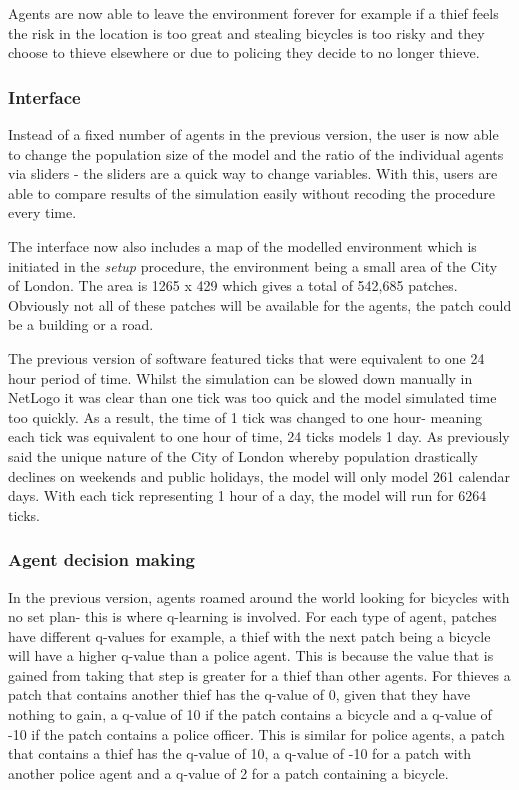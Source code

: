 \documentclass[11pt]{informatics-report}
\begin{document}
Agents are now able to leave the environment forever for example if a thief feels the risk in the location is too great and stealing bicycles is too risky and they choose to thieve elsewhere or due to policing they decide to no longer thieve. 

\subsubsection{Interface}
Instead of a fixed number of agents in the previous version, the user is now able to change the population size of the model and the ratio of the individual agents via sliders - the sliders are a quick way to change variables. With this, users are able to compare results of the simulation easily without recoding the procedure every time. 

The interface now also includes a map of the modelled environment which is initiated in the \textit{setup} procedure, the environment being a small area of the City of London. The area is 1265 x 429 which gives a total of 542,685 patches. Obviously not all of these patches will be available for the agents, the patch could be a building or a road. \par

The previous version of software featured ticks that were equivalent to one 24 hour period of time. Whilst the simulation can be slowed down manually in NetLogo it was clear than one tick was too quick and the model simulated time too quickly. As a result, the time of 1 tick was changed to one hour- meaning each tick was equivalent to one hour of time, 24 ticks models 1 day. As previously said the unique nature of the City of London whereby population drastically declines on weekends and public holidays, the model will only model 261 calendar days. With each tick representing 1 hour of a day, the model will run for 6264 ticks.

\subsubsection{Agent decision making}
In the previous version, agents roamed around the world looking for bicycles with no set plan- this is where q-learning is involved. For each type of agent, patches have different q-values for example, a thief with the next patch being a bicycle will have a higher q-value than a police agent. This is because the value that is gained from taking that step is greater for a thief than other agents. For thieves a patch that contains another thief has the q-value of 0, given that they have nothing to gain, a q-value of 10 if the patch contains a bicycle and a q-value of -10 if the patch contains a police officer. This is similar for police agents, a patch that contains a thief has the q-value of 10, a q-value of -10 for a patch with another police agent and a q-value of 2 for a patch containing a bicycle. 
\end{document}
